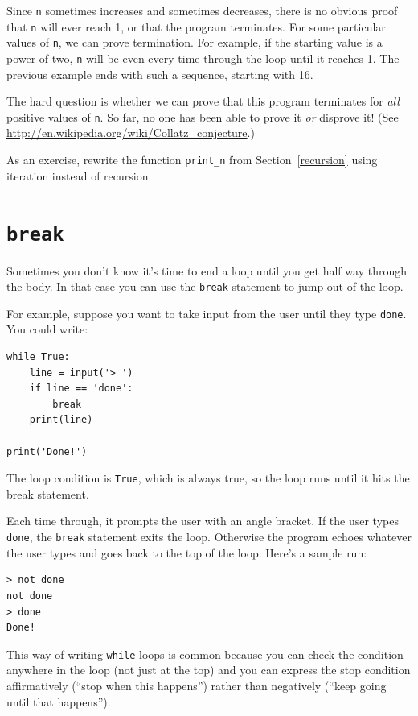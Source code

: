 \documentclass[10pt]{book}
\begin{document}
Since {\tt n} sometimes increases and sometimes decreases, there is no
obvious proof that {\tt n} will ever reach 1, or that the program
terminates.  For some particular values of {\tt n}, we can prove
termination.  For example, if the starting value is a power of two,
{\tt n} will be even every time through the loop
until it reaches 1. The previous example ends with such a sequence,
starting with 16.

The hard question is whether we can prove that this program terminates
for {\em all} positive values of {\tt n}.  So far, no one has
been able to prove it {\em or} disprove it!  (See
  \url{http://en.wikipedia.org/wiki/Collatz_conjecture}.)

As an exercise, rewrite the function \verb"print_n" from
Section~\ref{recursion} using iteration instead of recursion.


\section{{\tt break}}

Sometimes you don't know it's time to end a loop until you get half
way through the body.  In that case you can use the {\tt break}
statement to jump out of the loop.

For example, suppose you want to take input from the user until they
type {\tt done}.  You could write:

\begin{verbatim}
while True:
    line = input('> ')
    if line == 'done':
        break
    print(line)

print('Done!')
\end{verbatim}
%
The loop condition is {\tt True}, which is always true, so the
loop runs until it hits the break statement.

Each time through, it prompts the user with an angle bracket.
If the user types {\tt done}, the {\tt break} statement exits
the loop.  Otherwise the program echoes whatever the user types
and goes back to the top of the loop.  Here's a sample run:

\begin{verbatim}
> not done
not done
> done
Done!
\end{verbatim}
%
This way of writing {\tt while} loops is common because you
can check the condition anywhere in the loop (not just at the
top) and you can express the stop condition affirmatively
(``stop when this happens'') rather than negatively (``keep going
until that happens'').
\end{document}

